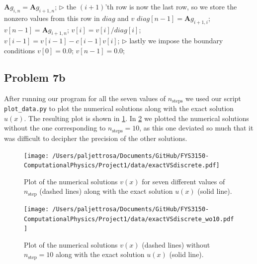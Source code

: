 \documentclass[english,notitlepage]{revtex4-1}  %
\begin{document}
\begin{algorithm}[H]
\begin{algorithmic}
        \State $\textbf{A}g_{i,n} = \textbf{A}g_{i+1,n}$; 
        \EndFor
        \State
        \State $\triangleright$ the $(i+1)$'th row is now the last row, so we store the nonzero values from this row in $diag$ and $v$
        \State $diag[n-1] = \textbf{A}g_{i+1,i}$;  
        \State $v[n-1] = \textbf{A}g_{i+1,n}$; 
        \State
         
        \State $v[i] = v[i]/diag[i]$;  
        \State $v[i-1] = v[i-1] - c[i-1]v[i]$; 
        \EndFor
        \State
        \State $\triangleright$ lastly we impose the boundary conditions
        \State $v[0] = 0.0$;  
        \State $v[n-1] = 0.0$;  
        
    \end{algorithmic}
\end{algorithm}

\subsection*{Problem 7b}
After running our program for all the seven values of $n_\text{steps}$ we used our script \verb|plot_data.py| to plot the numerical solutions along with the exact solution $u(x)$. The resulting plot is shown in \cref{plot7b}. In \cref{plot7b w/o 10} we plotted the numerical solutions without the one corresponding to $n_\text{steps} = 10$, as this one deviated so much that it was difficult to decipher the precision of the other solutions.

\begin{figure}[h!]
    \centering 
    \texttt{[image: /Users/paljettrosa/Documents/GitHub/FYS3150-ComputationalPhysics/Project1/data/exactVSdiscrete.pdf]} %
    \caption{Plot of the numerical solutions $v(x)$ for seven different values of $n_\text{step}$ (dashed lines) along with the exact solution $u(x)$ (solid line).}
    \label{plot7b}
\end{figure}

\begin{figure}[h!]
    \centering 
    \texttt{[image: /Users/paljettrosa/Documents/GitHub/FYS3150-ComputationalPhysics/Project1/data/exactVSdiscrete\_wo10.pdf]} %
    \caption{Plot of the numerical solutions $v(x)$ (dashed lines) without $n_\text{step} = 10$ along with the exact solution $u(x)$ (solid line).}
    \label{plot7b w/o 10}
\end{figure}
\end{document}
